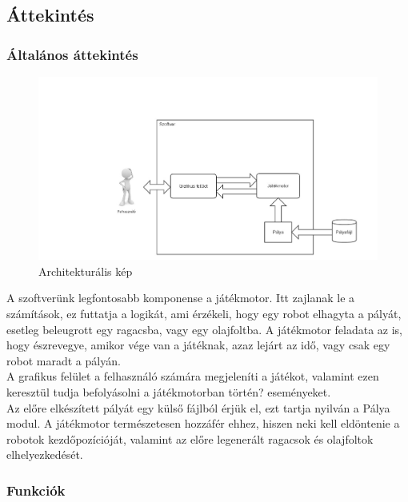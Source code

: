 

\subsection{Áttekintés}

\subsubsection{Általános áttekintés}

\begin{figure}[ht!]
	\centering
	\includegraphics[width=180mm, center]{./section2/dia1.jpg}
	\caption{Architekturális kép \label{overflow}}
\end{figure}

A szoftverünk legfontosabb komponense a játékmotor. Itt zajlanak le a számítások, ez futtatja a logikát, ami érzékeli, hogy egy robot elhagyta a pályát, esetleg beleugrott egy ragacsba, vagy egy olajfoltba. A játékmotor feladata az is, hogy észrevegye, amikor vége van a játéknak, azaz lejárt az idő, vagy csak egy robot maradt a pályán. \\

A grafikus felület a felhasználó számára megjeleníti a játékot, valamint ezen keresztül tudja befolyásolni a játékmotorban történ? eseményeket. \\

Az előre elkészített pályát egy külső fájlból érjük el, ezt tartja nyilván a Pálya modul. A játékmotor természetesen hozzáfér ehhez, hiszen neki kell eldöntenie a robotok kezdőpozícióját, valamint az előre legenerált ragacsok és olajfoltok elhelyezkedését. \\

\subsubsection{Funkciók}

